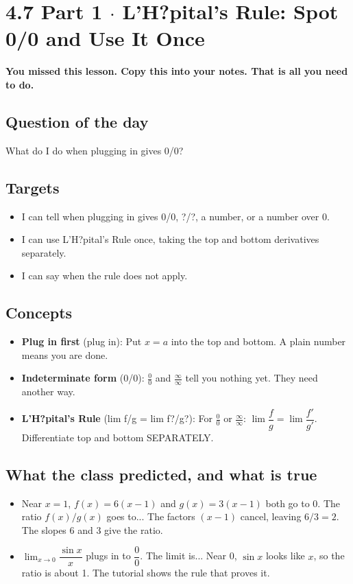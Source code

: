\documentclass[11pt]{article}
\begin{document}
\section*{4.7 Part 1 $\cdot$ L'H?pital's Rule: Spot 0/0 and Use It Once}
\textbf{You missed this lesson. Copy this into your notes. That is all you need to do.}\par\medskip
\subsection*{Question of the day}
What do I do when plugging in gives 0/0?\par
\subsection*{Targets}\begin{itemize}\item I can tell when plugging in gives 0/0, ?/?, a number, or a number over 0.
\item I can use L'H?pital's Rule once, taking the top and bottom derivatives separately.
\item I can say when the rule does not apply.\end{itemize}
\subsection*{Concepts}\begin{itemize}
\item \textbf{Plug in first} (plug in): Put $x=a$ into the top and bottom. A plain number means you are done.
\item \textbf{Indeterminate form} (0/0): $\frac00$ and $\frac{\infty}{\infty}$ tell you nothing yet. They need another way.
\item \textbf{L'H?pital's Rule} (lim f/g = lim f?/g?): For $\frac00$ or $\frac{\infty}{\infty}$: $\lim\dfrac fg=\lim\dfrac{f'}{g'}$. Differentiate top and bottom SEPARATELY.
\end{itemize}
\subsection*{What the class predicted, and what is true}\begin{itemize}
\item Near $x=1$, $f(x)=6(x-1)$ and $g(x)=3(x-1)$ both go to 0. The ratio $f(x)/g(x)$ goes to...  The factors $(x-1)$ cancel, leaving $6/3=2$. The slopes 6 and 3 give the ratio.
\item $\displaystyle\lim_{x\to0}\dfrac{\sin x}{x}$ plugs in to $\dfrac00$. The limit is...  Near 0, $\sin x$ looks like $x$, so the ratio is about 1. The tutorial shows the rule that proves it.
\end{itemize}
\end{document}
